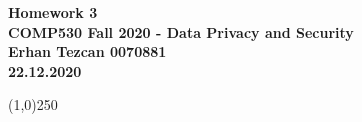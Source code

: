 \documentclass[12pt,reqno]{amsart}
\begin{document}
\begin{center}
\large\textbf{Homework 3 \\ COMP530 Fall 2020 - Data Privacy and Security \\}
\normalsize\textbf{ Erhan Tezcan 0070881 \\ 22.12.2020} \\
\end{center}

\begin{center}
\line(1,0){250}
\end{center}

%
%

\end{document}
